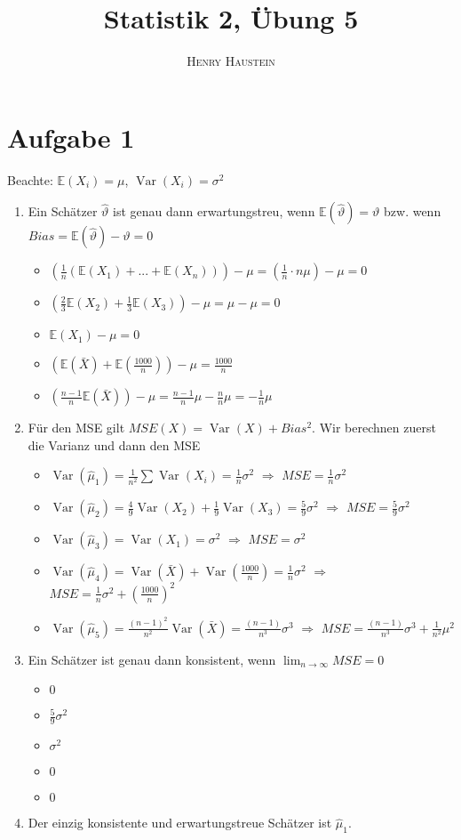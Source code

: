 \documentclass{article}
\title{\textbf{Statistik 2, Übung 5}}
\author{\textsc{Henry Haustein}}
\date{}
\newcommand{\E}{\mathbb{E}}
\DeclareMathOperator{\Var}{Var}
\begin{document}
	\maketitle
	
	\section*{Aufgabe 1}
	Beachte: $\E(X_i)=\mu$, $\Var(X_i)=\sigma^2$
	\begin{enumerate}[label=(\alph*)]
		\item Ein Schätzer $\hat{\vartheta}$ ist genau dann erwartungstreu, wenn $\E(\hat{\vartheta})=\vartheta$ bzw. wenn $Bias =\E(\hat{\vartheta}) - \vartheta = 0$
		\begin{itemize}
			\item $(\frac{1}{n}(\E(X_1) + ... + \E(X_n))) - \mu = (\frac{1}{n}\cdot n\mu)-\mu = 0$
			\item $(\frac{2}{3}\E(X_2) + \frac{1}{3}\E(X_3))-\mu = \mu-\mu = 0$
			\item $\E(X_1)-\mu = 0$
			\item $\left(\E(\bar{X}) + \E\left(\frac{1000}{n}\right)\right)-\mu = \frac{1000}{n}$
			\item $(\frac{n-1}{n}\E(\bar{X}))-\mu = \frac{n-1}{n}\mu - \frac{n}{n}\mu = -\frac{1}{n}\mu$
		\end{itemize}
		\item Für den MSE gilt $MSE(X) = \Var(X) + Bias^2$. Wir berechnen zuerst die Varianz und dann den MSE
		\begin{itemize}
			\item $\Var(\hat{\mu}_1) = \frac{1}{n^2}\sum\Var(X_i) = \frac{1}{n}\sigma^2$ $\Rightarrow$ $MSE=\frac{1}{n}\sigma^2$
			\item $\Var(\hat{\mu}_2) = \frac{4}{9}\Var(X_2) + \frac{1}{9}\Var(X_3) = \frac{5}{9}\sigma^2$ $\Rightarrow$ $MSE = \frac{5}{9}\sigma^2$
			\item $\Var(\hat{\mu}_3) = \Var(X_1) = \sigma^2$ $\Rightarrow$ $MSE = \sigma^2$
			\item $\Var(\hat{\mu}_4) = \Var(\bar{X}) + \Var\left(\frac{1000}{n}\right) = \frac{1}{n}\sigma^2$ $\Rightarrow$ $MSE = \frac{1}{n}\sigma^2 + \left(\frac{1000}{n}\right)^2$
			\item $\Var(\hat{\mu}_5) = \frac{(n-1)^2}{n^2}\Var(\bar{X}) = \frac{(n-1)}{n^3}\sigma^3$ $\Rightarrow$ $MSE=\frac{(n-1)}{n^3}\sigma^3 + \frac{1}{n^2}\mu^2$
		\end{itemize}
		\item Ein Schätzer ist genau dann konsistent, wenn $\lim_{n\to\infty} MSE = 0$
		\begin{itemize}
			\item $0$
			\item $\frac{5}{9}\sigma^2$
			\item $\sigma^2$
			\item $0$
			\item $0$
		\end{itemize}
		\item Der einzig konsistente und erwartungstreue Schätzer ist $\hat{\mu}_1$.
	\end{enumerate}
	
\end{document}
